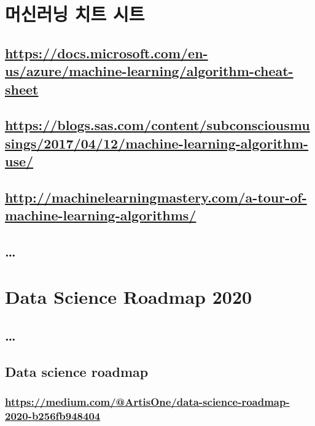 \documentclass[11pt]{article}
\begin{document}
\section{머신러닝 치트 시트}
\label{sec:orge9fe329}

\subsection{\url{https://docs.microsoft.com/en-us/azure/machine-learning/algorithm-cheat-sheet}}
\label{sec:org7df45e7}

\subsection{\url{https://blogs.sas.com/content/subconsciousmusings/2017/04/12/machine-learning-algorithm-use/}}
\label{sec:org9a6665a}

\subsection{\url{http://machinelearningmastery.com/a-tour-of-machine-learning-algorithms/}}
\label{sec:orgd1a1a07}

\subsection{\ldots{}}
\label{sec:org436a960}

\section{Data Science Roadmap 2020}
\label{sec:orgfa9b18b}

\subsection{\ldots{}}
\label{sec:orgbf99e36}

\subsection{Data science roadmap}
\label{sec:org071830e}

\subsubsection{\url{https://medium.com/@ArtisOne/data-science-roadmap-2020-b256fb948404}}
\label{sec:orgf45a5c8}
\end{document}
